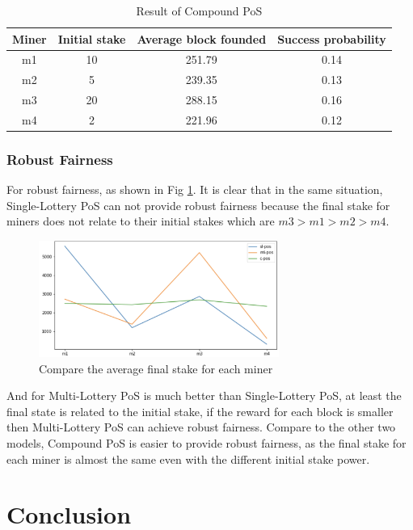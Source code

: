\documentclass{article}
\begin{document}
\begin{table}[h!]
\centering
\begin{tabular}{||c c c c||} 
 \hline
 Miner  & Initial stake & Average block founded & Success probability\\ [0.5ex] 
 \hline\hline
 m1 & 10 &  251.79 & 0.14\\
 m2 & 5 & 239.35 & 0.13\\
 m3 & 20 &  288.15  & 0.16\\
 m4 & 2 &  221.96  & 0.12\\ [1ex] 
 \hline
\end{tabular}
\caption{Result of Compound \gls{PoS}}
\label{table:c}
\end{table}

\subsubsection{Robust Fairness}
For robust fairness, as shown in Fig \ref{fig:pos}. It is clear that in the same situation, Single-Lottery \gls{PoS} can not provide robust fairness because the final stake for miners does not relate to their initial stakes which are $m3>m1>m2>m4$. 
\begin{figure}[hbt!]
\centering
\includegraphics[width=0.7\textwidth]{stakes}
\caption{Compare the average final stake for each miner}
\label{fig:pos}
\end{figure}


And for Multi-Lottery \gls{PoS} is much better than Single-Lottery \gls{PoS}, at least the final state is related to the initial stake, if the reward for each block is smaller then Multi-Lottery \gls{PoS} can achieve robust fairness. Compare to the other two models, Compound \gls{PoS} is easier to provide robust fairness, as the final stake for each miner is almost the same even with the different initial stake power.

\section{Conclusion}
\end{document}
